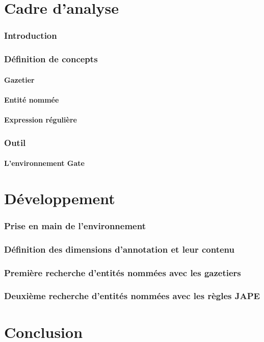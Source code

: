 \documentclass[a4paper, 11pt]{report}
\begin{document}
\part{Cadre d'analyse}
	\section*{Introduction}
	\section{Définition de concepts}
		\subsection{Gazetier}
		\subsection{Entité nommée}
		\subsection{Expression régulière}
	\section{Outil}
		\subsection{L'environnement Gate}



\part{Développement}

	\section{Prise en main de l'environnement}

	\section{Définition des dimensions d'annotation et leur contenu}

	\section{Première recherche d'entités nommées avec les gazetiers}

	\section{Deuxième recherche d'entités nommées avec les règles JAPE}

\part{Conclusion}
\end{document}
